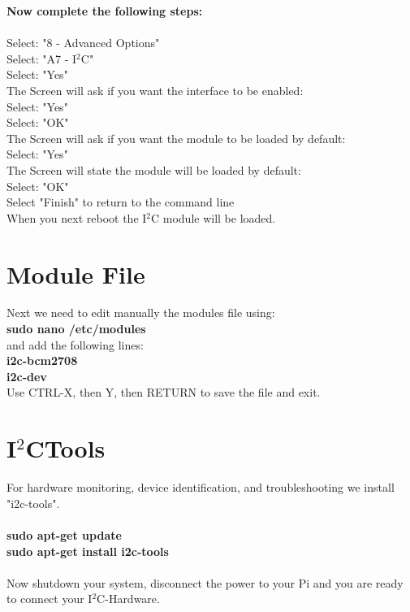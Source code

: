 \newpage
\textbf{Now complete the following steps:}\\\\
Select: "8 - Advanced Options"\\
Select: "A7 - I$^2$C"\\
Select: "Yes"\\
The Screen will ask if you want the interface to be enabled:\\
Select: "Yes"\\
Select: "OK"\\
The Screen will ask if you want the module to be loaded by default:\\
Select: "Yes"\\
The Screen will state the module will be loaded by default:\\
Select: "OK"\\
Select "Finish" to return to the command line \\
When you next reboot the I$^2$C module will be loaded.\\


\section{Module File}
\label{sec:modulefile}
Next we need to edit manually the modules file using:\\
\ttfamily \textbf{sudo nano /etc/modules}\\
\normalfont and add the following lines:\\
\ttfamily \textbf{i2c-bcm2708\\
									i2c-dev}\\
\normalfont									
Use CTRL-X, then Y, then RETURN to save the file and exit.								





\section{I$^2$CTools}
\label{sec:I2Ctools}

For hardware monitoring, device identification, and troubleshooting we install "i2c-tools".\\\\
\ttfamily \textbf{sudo apt-get update\\
									sudo apt-get install i2c-tools}\\\\
\normalfont
Now shutdown your system, disconnect the power to your Pi and you are ready to connect your I$^2$C-Hardware.\\									


